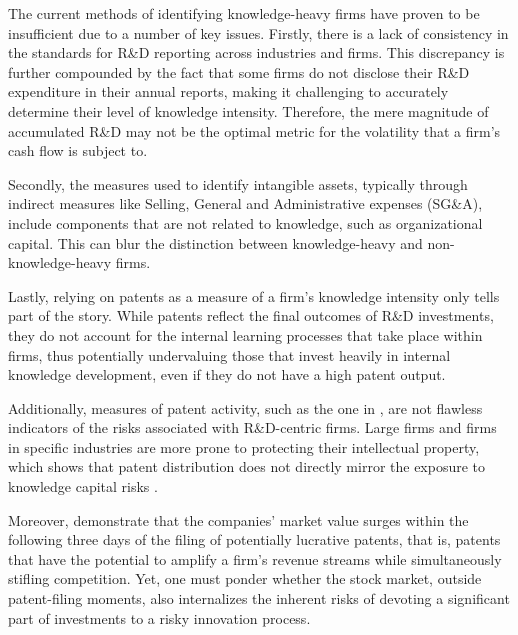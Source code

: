 \documentclass[12pt, letterpaper]{article}
\begin{document}

The current methods of identifying knowledge-heavy firms have proven to be insufficient due to a number of key issues. Firstly, there is a lack of consistency in the standards for R\&D reporting across industries and firms. This discrepancy is further compounded by the fact that some firms do not disclose their R\&D expenditure in their annual reports, making it challenging to accurately determine their level of knowledge intensity.  Therefore, the mere magnitude of accumulated R\&D may not be the optimal metric for the volatility that a firm's cash flow is subject to.

Secondly, the measures used to identify intangible assets, typically through indirect measures like Selling, General and Administrative expenses (SG\&A), include components that are not related to knowledge, such as organizational capital. This can blur the distinction between knowledge-heavy and non-knowledge-heavy firms.

Lastly, relying on patents as a measure of a firm's knowledge intensity only tells part of the story. While patents reflect the final outcomes of R\&D investments, they do not account for the internal learning processes that take place within firms, thus potentially undervaluing those that invest heavily in internal knowledge development, even if they do not have a high patent output.

Additionally, measures of patent activity, such as the one in \cite{Kogan2017-fx}, are not flawless indicators of the risks associated with R\&D-centric firms. Large firms and firms in specific industries are more prone to protecting their intellectual property, which shows that patent distribution does not directly mirror the exposure to knowledge capital risks \citep{mezzanotti2023innovation}.

Moreover, \citet{Kogan2017-fx} demonstrate that the companies' market value  surges within the following three days of the filing of potentially lucrative patents, that is, patents that have the potential to amplify a firm's revenue streams while simultaneously stifling competition. Yet, one must ponder whether the stock market, outside patent-filing moments, also internalizes the inherent risks of devoting a significant part of investments to a risky innovation process.
\end{document}
